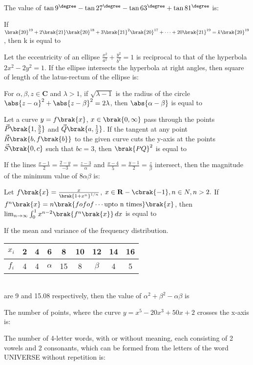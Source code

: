\iffalse
\title{Assignment}
\author{EE24BTECH11047 - Niketh Prakash Achanta}
\section{integer}
\fi
\item The value of $\tan{9}^{\degree}-\tan{27}^{\degree}-\tan{63}^{\degree}+\tan{81}^{\degree}$ is: 
\item If $\brak{20}^{19}+2\brak{21}\brak{20}^{18}+3\brak{21}^{2}\brak{20}^{17}+\cdots+20\brak{21}^{19}=k\brak{20}^{19}$, then k is equal to 

\item Let the eccentricity of an ellipse $\frac{x^2}{a^2}+\frac{y^2}{b^2}=1$ is reciprocal to that of the hyperbola $2x^2-2y^2=1$. If the ellipse intersects the hyperbola at right angles, then square of length of the latus-rectum of the ellipse is: 

\item For $\alpha,\beta,z\in\mathbf{C}$ and $\lambda>1$, if $\sqrt{\lambda-1}$ is the radius of the circle $\abs{z-\alpha}^2+\abs{z-\beta}^2=2\lambda$, then $\abs{\alpha-\beta}$ is equal to

\item Let a curve $y = f\brak{x}$,  $x\in\brak{0,\infty}$ pass through the points $\vec{P}\brak{1,\frac{3}{2}}$ and $\vec{Q}\brak{a,\frac{1}{2}}$. If the tangent at any point $\vec{R}\brak{b,f\brak{b}}$ to the given curve cuts the y-axis at the points $\vec{S}\brak{0,c}$ such that $bc=3$, then $\brak{PQ}^2$ is equal to

\item If the lines $\frac{x-1}{2} = \frac{2 - y}{-3} = \frac{z - 3}{\alpha}$ and $\frac{x - 4}{5} = \frac{y - 1}{2} = \frac{z}{\beta}$ intersect, then the magnitude of the minimum value of $8 \alpha \beta$ is:

\item Let $f\brak{x}=\frac{x}{\brak{1+x^{n}}^{1/n}}$, $x\in\mathbf{R}-\cbrak{-1},n\in N,n>2.$ If $f^n\brak{x}=n\brak{fofof\cdots \text{upto n times}}\brak{x}$, then\\
    $\lim_{n\to\infty}\int_{0}^{1} x^{n-2}\brak{f^n\brak{x}} \,dx$ is equal to

\item If the mean and variance of the frequency distribution. \\
    \begin{tabular}{|c|c|c|c|c|c|c|c|c|} 
        \hline
            $x_i$ & 2 & 4 & 6 & 8 & 10 & 12 & 14 & 16 \\ 
        \hline
            $f_i$ & 4 & 4 & $\alpha$ & 15 & 8 & $\beta$ & 4 & 5 \\ 
        \hline
    \end{tabular}\\
    are 9 and 15.08 respectively, then the  value of $\alpha^2+\beta^2-\alpha\beta$ is

\item The number of points, where the curve $y=x^{5}-20x^{3}+50x+2$ crosses the x-axis is:

\item The number of 4-letter words, with or without meaning, each consisting of 2 vowels and 2 consonants, which can be formed from the letters of the word UNIVERSE without repetition is: 

